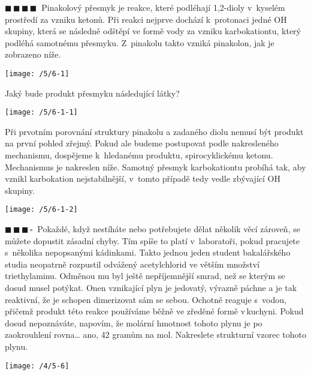 \documentclass{book}
\newcommand{\tri}{$\blacksquare \, \blacksquare \, \blacksquare \, \square \; \; $}
\newcommand{\ctyri}{$\blacksquare \, \blacksquare \, \blacksquare \, \blacksquare \; \; $}
\renewenvironment{quotation}{\par}{\par} %
\begin{document}
\hrulefill %
\begin{quotation}
\ctyri Pinakolový přesmyk je reakce, které podléhají 1,2-dioly v~kyselém
prostředí za vzniku ketonů. Při reakci nejprve dochází k~protonaci
jedné OH skupiny, která se následně odštěpí ve formě vody za vzniku
karbokationtu, který podléhá samotnému přesmyku. Z~pinakolu takto
vzniká pinakolon, jak je zobrazeno níže. 
\begin{center}
\texttt{[image: /5/6-1]} 
\par\end{center}
Jaký bude produkt přesmyku následující látky? 
\begin{center}
\texttt{[image: /5/6-1-1]} 
\par\end{center}

\end{quotation} \dotfill \par 
Při prvotním porovnání struktury pinakolu a zadaného diolu nemusí
být produkt na první pohled zřejmý. Pokud ale budeme postupovat podle
nakresleného mechanismu, dospějeme k~hledanému produktu, spirocyklickému
ketonu. Mechanismus je nakreslen níže. Samotný přesmyk karbokationtu
probíhá tak, aby vznikl karbokation nejstabilnější, v~tomto případě
tedy vedle zbývající OH skupiny. 
\begin{center}
\texttt{[image: /5/6-1-2]} 
\par\end{center}

\newpage %
\begin{quotation}
\tri Pokaždé, když nestíháte nebo potřebujete dělat několik věcí zároveň,
se můžete dopustit zásadní chyby. Tím spíše to platí v~laboratoři,
pokud pracujete s~několika nepopsanými kádinkami. Takto jednou jeden
student bakalářského studia neopatrně rozpustil odvážený acetylchlorid
ve větším množství triethylaminu. Odměnou mu byl ještě nepříjemnější
smrad, než se kterým se dosud musel potýkat. Onen vznikající plyn
je jedovatý, výrazně páchne a je tak reaktivní, že je schopen dimerizovat
sám se sebou. Ochotně reaguje s~vodou, přičemž produkt této reakce
používáme běžně ve zředěné formě v\,kuchyni. Pokud dosud nepoznáváte,
napovím, že molární hmotnost tohoto plynu je po zaokrouhlení rovna\ldots
ano, 42 gramům na mol. Nakreslete strukturní vzorec tohoto plynu.
\end{quotation} \dotfill \par 
\noindent \begin{center}

\texttt{[image: /4/5-6]}

\par\end{center}
\end{document}
